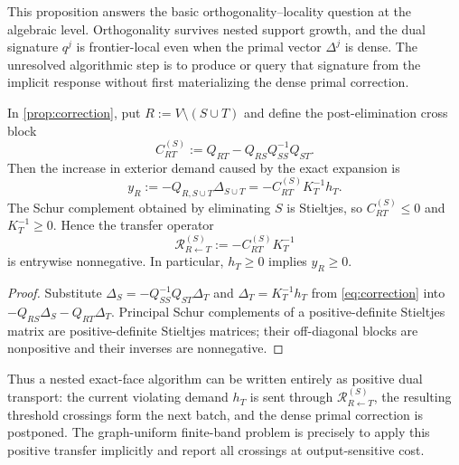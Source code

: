 This proposition answers the basic orthogonality--locality question at the
algebraic level.  Orthogonality survives nested support growth, and the dual
signature $q^j$ is frontier-local even when the primal vector $\Delta^j$ is
dense.  The unresolved algorithmic step is to produce or query that signature
from the implicit response without first materializing the dense primal
correction.

\begin{corollary}
\label{cor:positive-dual-transfer}
In \cref{prop:correction}, put $R:=V\setminus(S\cup T)$ and define the
post-elimination cross block
\begin{equation}
 C_{RT}^{(S)}
 :=Q_{RT}-Q_{RS}Q_{SS}^{-1}Q_{ST}.
 \label{eq:post-elimination-cross-block}
\end{equation}
Then the increase in exterior demand caused by the exact expansion is
\begin{equation}
 y_R
 :=-Q_{R,S\cup T}\Delta_{S\cup T}
 =-C_{RT}^{(S)}K_T^{-1}h_T.
 \label{eq:positive-dual-transfer}
\end{equation}
The Schur complement obtained by eliminating $S$ is Stieltjes, so
$C_{RT}^{(S)}\leq0$ and $K_T^{-1}\geq0$.  Hence the transfer operator
\begin{equation}
 \mathcal R_{R\leftarrow T}^{(S)}
 :=-C_{RT}^{(S)}K_T^{-1}
 \label{eq:dual-response-operator}
\end{equation}
is entrywise nonnegative.  In particular, $h_T\geq0$ implies $y_R\geq0$.
\end{corollary}

\begin{proof}
Substitute
$\Delta_S=-Q_{SS}^{-1}Q_{ST}\Delta_T$ and
$\Delta_T=K_T^{-1}h_T$ from \cref{eq:correction} into
$-Q_{RS}\Delta_S-Q_{RT}\Delta_T$.  Principal Schur complements of a
positive-definite Stieltjes matrix are positive-definite Stieltjes matrices;
their off-diagonal blocks are nonpositive and their inverses are
nonnegative.
\end{proof}

Thus a nested exact-face algorithm can be written entirely as positive dual
transport: the current violating demand $h_T$ is sent through
$\mathcal R_{R\leftarrow T}^{(S)}$, the resulting threshold crossings form
the next batch, and the dense primal correction is postponed.  The
graph-uniform finite-band problem is precisely to apply this positive transfer
implicitly and report all crossings at output-sensitive cost.

